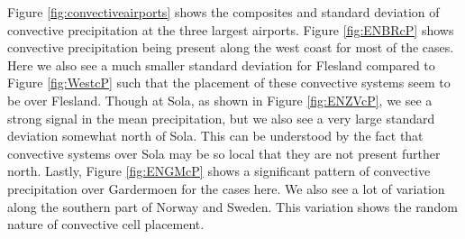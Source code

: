 Figure \ref{fig:convectiveairports} shows the composites and standard deviation of convective precipitation at the three largest airports. Figure \ref{fig:ENBRcP} shows convective precipitation being present along the west coast for most of the cases. Here we also see a much smaller standard deviation for Flesland compared to Figure \ref{fig:WestcP} such that the placement of these convective systems seem to be over Flesland. Though at Sola, as shown in Figure \ref{fig:ENZVcP}, we see a strong signal in the mean precipitation, but we also see a very large standard deviation somewhat north of Sola. This can be understood by the fact that convective systems over Sola may be so local that they are not present further north. Lastly, Figure \ref{fig:ENGMcP} shows a significant pattern of convective precipitation over Gardermoen for the cases here. We also see a lot of variation along the southern part of Norway and Sweden. This variation shows the random nature of convective cell placement. 

